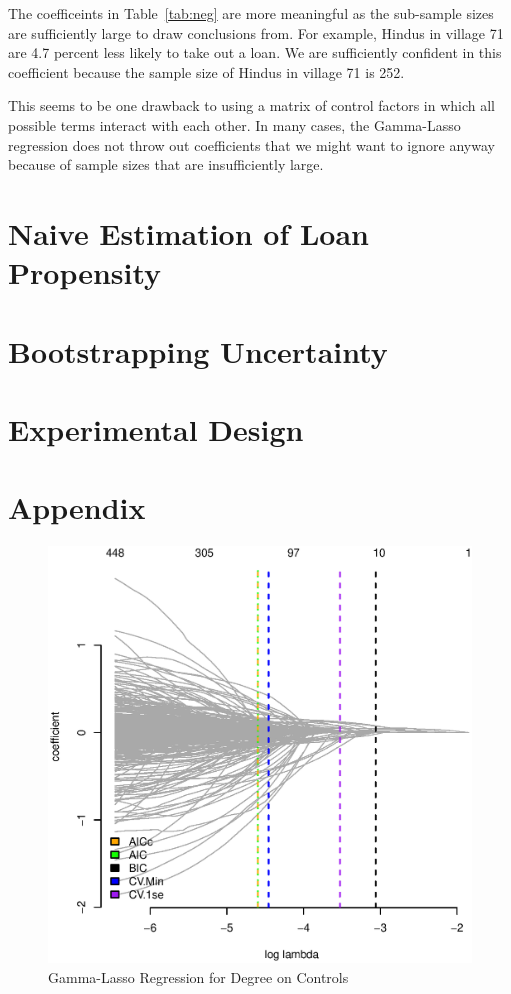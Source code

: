\documentclass[11pt, fleqn]{article}
\begin{document}
The coefficeints in Table~\ref{tab:neg} are more meaningful as the sub-sample sizes are sufficiently large to draw conclusions from. For example, Hindus in village 71 are 4.7 percent less likely to take out a loan. We are sufficiently confident in this coefficient because the sample size of Hindus in village 71 is 252. 

This seems to be one drawback to using a matrix of control factors in which all possible terms interact with each other. In many cases, the Gamma-Lasso regression does not throw out coefficients that we might want to ignore anyway because of sample sizes that are insufficiently large. 





\section{Naive Estimation of Loan Propensity}

\section{Bootstrapping Uncertainty}

\section{Experimental Design}

\section{Appendix}

\begin{figure}[!htb]
  \centering
  \includegraphics[scale=.5]{treat_aic.eps}
  \caption{Gamma-Lasso Regression for Degree on Controls}
  \label{fig:treat_aic}
\end{figure}
\end{document}
